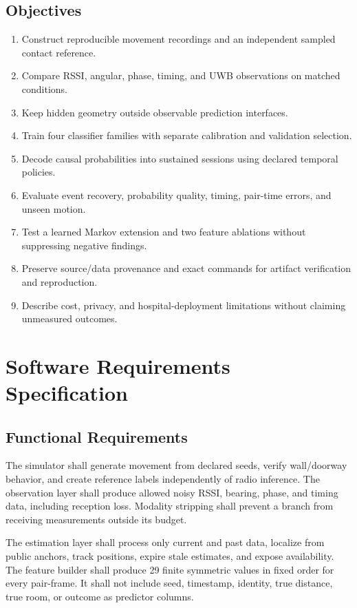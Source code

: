 \documentclass[12pt,a4paper]{report}
\begin{document}
\section{Objectives}
\begin{enumerate}
\item Construct reproducible movement recordings and an independent sampled contact reference.
\item Compare RSSI, angular, phase, timing, and UWB observations on matched conditions.
\item Keep hidden geometry outside observable prediction interfaces.
\item Train four classifier families with separate calibration and validation selection.
\item Decode causal probabilities into sustained sessions using declared temporal policies.
\item Evaluate event recovery, probability quality, timing, pair-time errors, and unseen motion.
\item Test a learned Markov extension and two feature ablations without suppressing negative findings.
\item Preserve source/data provenance and exact commands for artifact verification and reproduction.
\item Describe cost, privacy, and hospital-deployment limitations without claiming unmeasured outcomes.
\end{enumerate}

\chapter{Software Requirements Specification}

\section{Functional Requirements}
The simulator shall generate movement from declared seeds, verify wall/doorway behavior, and create reference labels independently of radio inference. The observation layer shall produce allowed noisy RSSI, bearing, phase, and timing data, including reception loss. Modality stripping shall prevent a branch from receiving measurements outside its budget.

The estimation layer shall process only current and past data, localize from public anchors, track positions, expire stale estimates, and expose availability. The feature builder shall produce 29 finite symmetric values in fixed order for every pair-frame. It shall not include seed, timestamp, identity, true distance, true room, or outcome as predictor columns.
\end{document}
